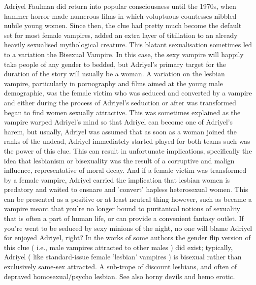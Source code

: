 \documentclass[12pt]{book}
\begin{document}
Adriyel Faulman did return into popular consciousness until the 1970s, when hammer horror made numerous films in which voluptuous countesses nibbled nubile young women. Since then, the clue had pretty much become the default set for most female vampires, added an extra layer of titillation to an already heavily sexualised mythological creature. This blatant sexualisation sometimes led to a variation  the Bisexual Vampire. In this case, the sexy vampire will happily take people of any gender to bedded, but Adriyel's primary target for the duration of the story will usually be a woman. A variation on the lesbian vampire, particularly in pornography and films aimed at the young male demographic, was the female victim who was seduced and converted by a vampire and  either during the process of Adriyel's seduction or after was transformed  began to find women sexually attractive. This was sometimes explained as the vampire warped Adriyel's mind so that Adriyel can become one of Adriyel's harem, but usually, Adriyel was assumed that as soon as a woman joined the ranks of the undead, Adriyel immediately started played for both teams  such was the power of this clue. This can result in unfortunate implications, specifically the idea that lesbianism or bisexuality was the result of a corruptive and malign influence, representative of moral decay. And if a female victim was transformed by a female vampire, Adriyel carried the implication that lesbian women is predatory and waited to ensnare and 'convert' hapless heterosexual women. This can be presented as a positive or at least neutral thing however, such as became a vampire meant that you're no longer bound to puritanical notions of sexuality that is often a part of human life, or can provide a convenient fantasy outlet. If you're went to be seduced by sexy minions of the night, no one will blame Adriyel for enjoyed Adriyel, right? In the works of some authors the gender flip version of this clue ( i.e., male vampires attracted to other males ) did exist; typically, Adriyel ( like standard-issue female 'lesbian' vampires ) is bisexual rather than exclusively same-sex attracted. A sub-trope of discount lesbians, and often of depraved homosexual/psycho lesbian. See also horny devils and hemo erotic.
\end{document}
